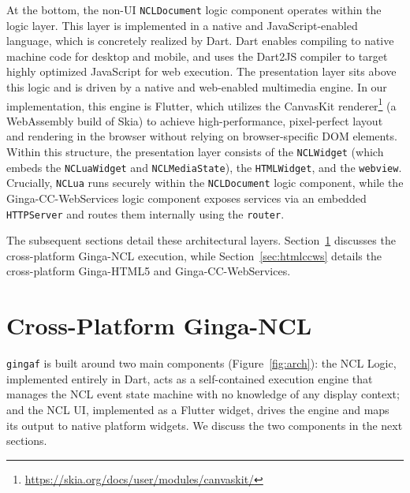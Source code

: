 \documentclass[sigconf,authorversion,review,authordraft]{webmedia}
\newcommand{\projectname}{\texttt{gingaf}}
\begin{document}
At the bottom, the non-UI \texttt{NCLDocument} logic component operates within the logic layer. This layer is implemented in a native and JavaScript-enabled language, which is concretely realized by Dart. Dart enables compiling to native machine code for desktop and mobile, and uses the Dart2JS compiler to target highly optimized JavaScript for web execution. The presentation layer sits above this logic and is driven by a native and web-enabled multimedia engine. In our implementation, this engine is Flutter, which utilizes the CanvasKit renderer\footnote{\url{https://skia.org/docs/user/modules/canvaskit/}} (a WebAssembly build of Skia) to achieve high-performance, pixel-perfect layout and rendering in the browser without relying on browser-specific DOM elements. Within this structure, the presentation layer consists of the \texttt{NCLWidget} (which embeds the \texttt{NCLuaWidget} and \texttt{NCLMediaState}), the \texttt{HTMLWidget}, and the \texttt{webview}. Crucially, \texttt{NCLua} runs securely within the \texttt{NCLDocument} logic component, while the Ginga-CC-WebServices logic component exposes services via an embedded \texttt{HTTPServer} and routes them internally using the \texttt{router}.

The subsequent sections detail these architectural layers. Section~\ref{sec:nclplayer} discusses the cross-platform Ginga-NCL execution, while Section~\ref{sec:htmlccws} details the cross-platform Ginga-HTML5  and Ginga-CC-WebServices.

\section{Cross-Platform Ginga-NCL}
\label{sec:nclplayer}

\projectname{} is built around two main components (Figure~\ref{fig:arch}): the NCL Logic, implemented entirely in Dart, acts as a self-contained execution engine that manages the NCL event state machine with no knowledge of any display context; and the NCL UI, implemented as a Flutter widget, drives the engine and maps its output to native platform widgets. We discuss the two components in the next sections.
\end{document}
